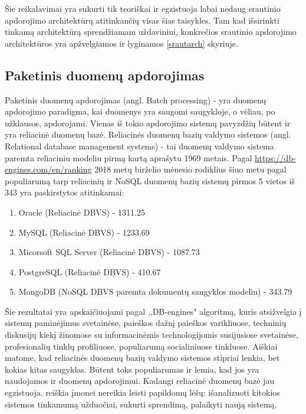 \documentclass{VUMIFPSkursinis}
\begin{document}
        Šie reikalavimai yra sukurti tik teoriškai ir egzistuoja labai nedaug srautinio apdorojimo architektūrų atitinkančių visas šias taisykles. Tam kad išsirinkti tinkamą architektūrą sprendžiamam uždaviniui, 
        konkrečios srautinio apdorojimo architektūros yra apžvelgiamos ir lyginamos \ref{srautarch} skyriuje.

\subsection{Paketinis duomenų apdorojimas}
    Paketinis duomenų apdorojimas (angl. Batch processing) - yra duomenų apdorojimo paradigma, kai duomenys yra saugomi saugykloje, o vėliau, po užklausos, apdorojami.
    Vienas iš tokio apdorojimo sistemų pavyzdžių būtent ir yra reliacinė duomenų bazė. Reliacinės duomenų bazių valdymo sistemos (angl. Relational database management systems) - tai 
    duomenų valdymo sistema paremta reliaciniu modeliu pirmą kartą aprašytu 1969 metais\cite{codd1969derivability}.
    Pagal \url{https://db-engines.com/en/ranking} 2018 metų birželio mėnesio rodiklius šiuo metu pagal populiarumą tarp reliacinių ir NoSQL duomenų bazių sistemų pirmos 5 vietos iš 343 yra paskirstytos atitinkamai:
    \begin{enumerate}
        \item Oracle (Reliacinė DBVS) - 1311.25
        \item MySQL (Reliacinė DBVS) - 1233.69
        \item Micorsoft SQL Server (Reliacinė DBVS) - 1087.73
        \item PostgreSQL (Reliacinė DBVS) - 410.67
        \item MongoDB (NoSQL DBVS paremta dokumentų saugyklos modeliu) - 343.79
    \end{enumerate}\par
        Šie rezultatai yra apskaičiuojami pagal ,,DB-engines" algoritmą, kuris atsižvelgia į sistemų paminėjimus svetainėse, paieškos dažnį paieškos varikliuose, techninių diskusijų kiekį
       žinomose su informacinėmis technologijomis susijusiose svetainėse, profesionalių tinklų profiliuose, populiarumą socialiniuose tinkluose\cite{dbengines}. Aiškiai matome, kad reliacinės
    duomenų bazių valdymo sistemos stipriai lenkia, bet kokias kitas saugyklas. Būtent toks populiarumas ir lemia, kad jos yra naudojamos ir duomenų apdorojimui. Kadangi reliacinė
    duomenų bazė jau egzistuoja, reiškia įmonei nereikia leisti papildomų lėšų: išanalizuoti kitokios sistemos tinkamumą užduočiai, sukurti sprendimą, palaikyti naują sistemą, 
\end{document}
